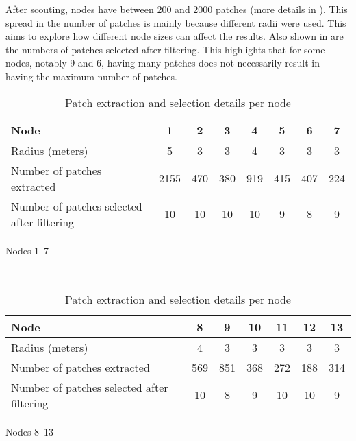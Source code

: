 After scouting, nodes have between 200 and 2000 patches (more details in ).
This spread in the number of patches is mainly because different radii were used.
This aims to explore how different node sizes can affect the results.
Also shown in  are the numbers of patches selected after filtering.
This highlights that for some nodes, notably 9 and 6, having many patches does not necessarily result in having the maximum
number of patches.

\begin{table}[ht!]
    \centering
    \centering
    \begin{subtable}[t]{0.90\textwidth}
        \centering
        \begin{tabular}{|>{\raggedright\arraybackslash}p{2.5cm}|c|c|c|c|c|c|c|}
            \hline
            Node                                       & 1    & 2   & 3   & 4   & 5   & 6   & 7   \\ \hline
            Radius (meters)                            & 5    & 3   & 3   & 4   & 3   & 3   & 3   \\ \hline
            Number of patches extracted                & 2155 & 470 & 380 & 919 & 415 & 407 & 224 \\ \hline
            Number of patches selected after filtering & 10   & 10  & 10  & 10  & 9   & 8   & 9   \\ \hline
        \end{tabular}
        \caption{Nodes 1–7}
    \end{subtable}
    \\
    \begin{subtable}[t]{0.90\textwidth}
        \centering
        \begin{tabular}{|>{\raggedright\arraybackslash}p{2.5cm}|c|c|c|c|c|c|}
            \hline
            Node                                       & 8   & 9   & 10  & 11  & 12  & 13  \\ \hline
            Radius (meters)                            & 4   & 3   & 3   & 3   & 3   & 3   \\ \hline
            Number of patches extracted                & 569 & 851 & 368 & 272 & 188 & 314 \\ \hline
            Number of patches selected after filtering & 10  & 8   & 9   & 10  & 10  & 9   \\ \hline
        \end{tabular}
        \caption{Nodes 8–13}
    \end{subtable}
    \caption{Patch extraction and selection details per node}
    \label{tab:montmorency:node_details}
\end{table}


